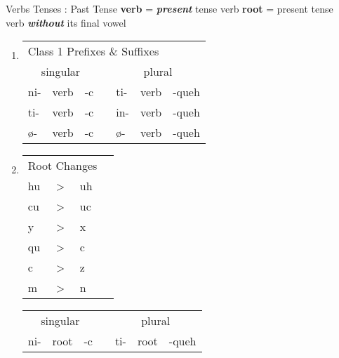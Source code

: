 \documentclass[12pt]{beamer}
\newcommand{\nah}[1]{\textcolor{nahgrn}{#1}}
\newcommand{\trs}[1]{\textcolor{nahblu}{#1}}
\begin{document}
\begin{frame}
\begin{columns}[t]
\begin{column}{.23\linewidth}
    \end{column}
    \begin{column}{.26\linewidth}
      \begin{block}{Verbs Tenses : Past Tense}
      	\textbf{verb} = \textbf{\textit{present}} tense verb \newline
      	\textbf{root} = present tense verb \textbf{\textit{without}} its final vowel \newline
      	\begin{enumerate}
      		\item \begin{tabular}[t]{lllllll}
      			\multicolumn{7}{l}{Class 1 \nah{Prefixes} \& \trs{Suffixes}}       	         \\
      			\multicolumn{3}{c}{singular}    & \vline & \multicolumn{3}{c}{plural}        \\
      			\cline{1-7}
      			\nah{ni-}   & verb & \trs{-c}   & \vline & \nah{ti-}   & verb & \trs{-queh}  \\
      			\nah{ti-}   & verb & \trs{-c}   & \vline & \nah{in-}   & verb & \trs{-queh}  \\
      			\nah{ø-}    & verb & \trs{-c}   & \vline & \nah{ø-}    & verb & \trs{-queh}  \\
      		\end{tabular}%
      		\item \text{Class 2 \nah{Prefixes} \& \trs{Suffixes}}
      		\newline
      		\begin{tabular}[t]{llll}
      			\multicolumn{3}{c}{Root Changes} & \vline \\
      			\cline{1-3}
      			hu & > & uh & \vline	\\
      			cu & > & uc & \vline	\\
      			y & > & x 	& \vline	\\
      			qu & > & c 	& \vline 	\\
      			c & > & z 	& \vline 	\\
      			m & > & n 	& \vline 	\\
      		\end{tabular}%
      		\begin{tabular}[t]{lllllll}
      			\multicolumn{3}{c}{singular}    & \vline & \multicolumn{3}{c}{plural}        \\
      			\cline{1-7}
      			\nah{ni-}   & root & \trs{-c}   & \vline & \nah{ti-}   & root & \trs{-queh}  \\

\end{tabular}
\end{enumerate}
\end{block}
\end{column}
\end{columns}
\end{frame}
\end{document}
